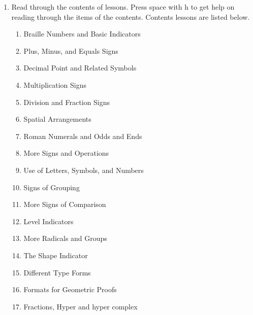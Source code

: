 \documentclass[10pt,letterpaper,twoside]{report}
\begin{document}
{{{{\begin{enumerate}
	\item Read through the contents of lessons.  Press space with h to get help on reading through the items of the contents.  Contents lessons are listed below.
	      
	      \begin{enumerate}
		      \item Braille Numbers and Basic Indicators
		            
		      \item Plus, Minus, and Equals Signs
		            
		      \item Decimal Point and Related Symbols
		            
		      \item Multiplication Signs
		            
		      \item Division and Fraction Signs
		            
		      \item Spatial Arrangements
		            
		      \item Roman Numerals and Odds and Ends
		            
		      \item More Signs and Operations
		            
		      \item Use of Letters, Symbols, and Numbers
		            
		      \item Signs of Grouping
		            
		      \item More Signs of Comparison
		            
		      \item Level Indicators
		            
		      \item More Radicals and Groups
		            
		      \item The Shape Indicator
		            
		      \item Different Type Forms
		            
		      \item Formats for Geometric Proofs
		            
		      \item Fractions, Hyper and hyper complex
		            

\end{enumerate}
\end{enumerate}}}}}
\end{document}
